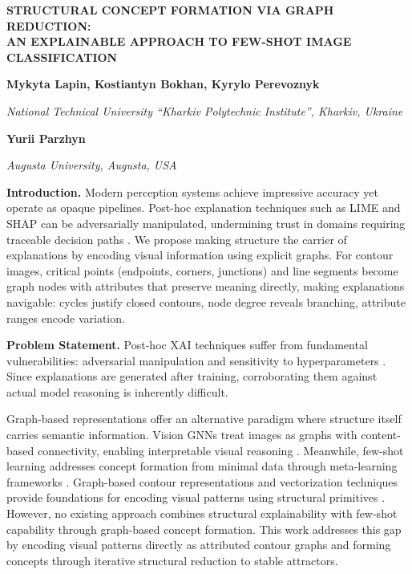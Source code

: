 \documentclass[12pt,a4paper]{article}
\begin{document}
\begin{center}
\textbf{STRUCTURAL CONCEPT FORMATION VIA GRAPH REDUCTION: \\
AN EXPLAINABLE APPROACH TO FEW-SHOT IMAGE CLASSIFICATION}

\vspace{0.3cm}

\textbf{Mykyta Lapin, Kostiantyn Bokhan, Kyrylo Perevoznyk}

\textit{National Technical University ``Kharkiv Polytechnic Institute'', Kharkiv, Ukraine}

\textbf{Yurii Parzhyn}

\textit{Augusta University, Augusta, USA}
\end{center}

\vspace{0.5cm}

\textbf{Introduction.} Modern perception systems achieve impressive accuracy yet operate as opaque pipelines. Post-hoc explanation techniques such as LIME and SHAP can be adversarially manipulated, undermining trust in domains requiring traceable decision paths \cite{ribeiro2016should,slack2020foolinglimeshapadversarial}. We propose making structure the carrier of explanations by encoding visual information using explicit graphs. For contour images, critical points (endpoints, corners, junctions) and line segments become graph nodes with attributes that preserve meaning directly, making explanations navigable: cycles justify closed contours, node degree reveals branching, attribute ranges encode variation.

\textbf{Problem Statement.} Post-hoc XAI techniques suffer from fundamental vulnerabilities: adversarial manipulation and sensitivity to hyperparameters \cite{hooshyar2024problems}. Since explanations are generated after training, corroborating them against actual model reasoning is inherently difficult.

Graph-based representations offer an alternative paradigm where structure itself carries semantic information. Vision GNNs treat images as graphs with content-based connectivity, enabling interpretable visual reasoning \cite{han2022vision}. Meanwhile, few-shot learning addresses concept formation from minimal data through meta-learning frameworks \cite{snell2017prototypical}. Graph-based contour representations and vectorization techniques provide foundations for encoding visual patterns using structural primitives \cite{parzhin2013principles,parzhin2022vectorization}. However, no existing approach combines structural explainability with few-shot capability through graph-based concept formation. This work addresses this gap by encoding visual patterns directly as attributed contour graphs and forming concepts through iterative structural reduction to stable attractors.
\end{document}
